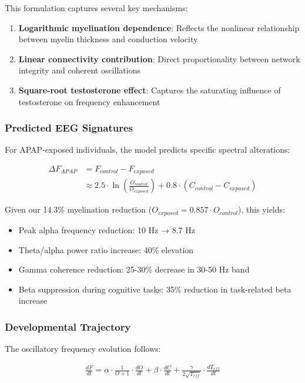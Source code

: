 \documentclass[11pt]{article}
\let\oldsubsubsection\subsubsection
\renewcommand{\subsubsection}[1]{\oldsubsubsection{#1}\setlength{\leftskip}{1.5em}}
\begin{document}
This formulation captures several key mechanisms:
\begin{enumerate}
\item \textbf{Logarithmic myelination dependence}: Reflects the nonlinear relationship between myelin thickness and conduction velocity
\item \textbf{Linear connectivity contribution}: Direct proportionality between network integrity and coherent oscillations
\item \textbf{Square-root testosterone effect}: Captures the saturating influence of testosterone on frequency enhancement
\end{enumerate}

\subsubsection{Predicted EEG Signatures}

For APAP-exposed individuals, the model predicts specific spectral alterations:

\begin{align}
\Delta F_{APAP} &= F_{control} - F_{exposed} \\
&\approx 2.5 \cdot \ln\left(\frac{O_{control}}{O_{exposed}}\right) + 0.8 \cdot (C_{control} - C_{exposed})
\end{align}

Given our 14.3\% myelination reduction ($O_{exposed} = 0.857 \cdot O_{control}$), this yields:
\begin{itemize}
\item Peak alpha frequency reduction: 10 Hz → 8.7 Hz
\item Theta/alpha power ratio increase: 40\% elevation
\item Gamma coherence reduction: 25-30\% decrease in 30-50 Hz band
\item Beta suppression during cognitive tasks: 35\% reduction in task-related beta increase
\end{itemize}

\subsubsection{Developmental Trajectory}

The oscillatory frequency evolution follows:

\begin{align}
\frac{dF}{dt} = \alpha \cdot \frac{1}{O+1} \cdot \frac{dO}{dt} + \beta \cdot \frac{dC}{dt} + \frac{\gamma}{2\sqrt{T_{eff}}} \cdot \frac{dT_{eff}}{dt}
\end{align}
\end{document}
